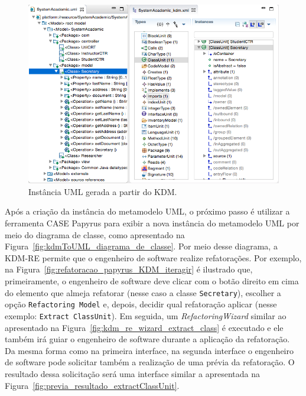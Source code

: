 \begin{figure}[!h]
	\centering
	\caption{Instância UML gerada a partir do KDM.}
	\label{fig:kdmToUML}
	\includegraphics[scale=0.5]{images/kdmToUML}
	\fautor
\end{figure}

Após a criação da instância do metamodelo UML, o próximo passo é utilizar a ferramenta CASE Papyrus para exibir a nova instância do metamodelo UML por meio do diagrama de classe, como apresentado na Figura~\ref{fig:kdmToUML_diagrama_de_classe}. Por meio desse diagrama, a KDM-RE permite que o engenheiro de software realize refatorações. Por exemplo, na Figura~\ref{fig:refatoracao_papyrus_KDM_iteragir} é ilustrado que, primeiramente, o engenheiro de software deve clicar com o botão direito em cima do elemento que almeja refatorar (nesse caso a classe \texttt{Secretary}), escolher a opção \texttt{Refactoring Model} e, depois, decidir qual refatoração aplicar (nesse exemplo: \texttt{Extract ClassUnit}). Em seguida, um \textit{RefactoringWizard} similar ao apresentado na Figura~\ref{fig:kdm_re_wizard_extract_class} é executado e ele também irá guiar o engenheiro de software durante a aplicação da refatoração. Da mesma forma como na primeira interface, na segunda interface o engenheiro de software pode solicitar também a realização de uma prévia da refatoração. O resultado dessa solicitação será uma interface similar a apresentada na Figura~\ref{fig:previa_resultado_extractClassUnit}.

